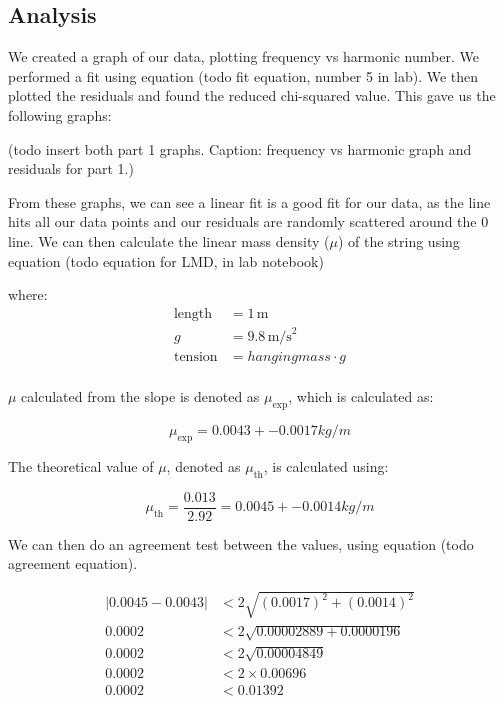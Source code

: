 \documentclass[11pt]{article}
\begin{document}
    
    \subsection{Analysis}\label{subsec:part_1_analysis}
    We created a graph of our data, plotting frequency vs harmonic number. We performed a fit using equation (todo fit equation, number 5 in lab). We then plotted the residuals and found the reduced chi-squared value. This gave us the following graphs:

    (todo insert both part 1 graphs. Caption: frequency vs harmonic graph and residuals for part 1.)

    From these graphs, we can see a linear fit is a good fit for our data, as the line hits all our data points and our residuals are randomly scattered around the 0 line. We can then calculate the linear mass density ($\mu$) of the string using equation (todo equation for LMD, in lab notebook)
    
    where:
    \begin{align*}
    \text{length} &= 1 \, \text{m} \\
    g &= 9.8 \, \text{m/s}^2 \\
    \text{tension} &= hanging mass \cdot g\\
    \end{align*}
    
    $\mu$ calculated from the slope is denoted as $\mu_{\text{exp}}$, which is calculated as:
    
    \begin{equation}
    \mu_{\text{exp}} = 0.0043 +- 0.0017 kg/m
    \end{equation}
    
    The theoretical value of $\mu$, denoted as $\mu_{\text{th}}$, is calculated using:
    
    \begin{equation}
    \mu_{\text{th}} = \frac{0.013}{2.92} = 0.0045 +- 0.0014 kg/m
    \end{equation}

    We can then do an agreement test between the values, using equation (todo agreement equation).

    \begin{align*}
    |0.0045 - 0.0043| &< 2 \sqrt{(0.0017)^2 + (0.0014)^2} \\
    0.0002 &< 2 \sqrt{0.00002889 + 0.0000196} \\
    0.0002 &< 2 \sqrt{0.00004849} \\
    0.0002 &< 2 \times 0.00696 \\
    0.0002 &< 0.01392
    \end{align*}
\end{document}

